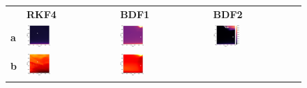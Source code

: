 \begin{figure}[H]
    \centering
	\begin{tabularx}{\textwidth}{m{} >{\centering\arraybackslash}m{} >{\centering\arraybackslash}m{} >{\centering\arraybackslash}m{}}
		& \textbf{RKF4} & \textbf{BDF1} & \textbf{BDF2} \\
		\textbf{a} &
    	\includegraphics[width=0.28\textwidth]{images/analysis_RKF45_TS.png} & 
    	\includegraphics[width=0.28\textwidth]{images/analysis_BDF12_TS.png} & 
    	\includegraphics[width=0.31\textwidth]{images/analysis_BDF23_TS.png} \\
		\textbf{b} &
    	\includegraphics[width=0.28\textwidth]{images/analysis_RKF45_NI.png} &
		\includegraphics[width=0.28\textwidth]{images/analysis_BDF12_NI.png} &

\end{tabularx}
\end{figure}
